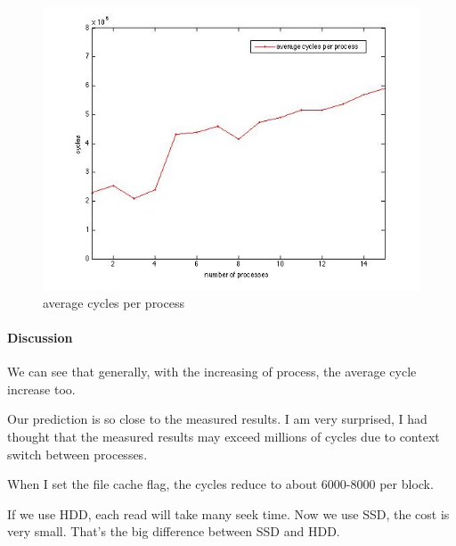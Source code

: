 \begin{figure}[htbp] %
   \centering
   \includegraphics[width=4.5in]{./pics/44.jpg} 
   \caption{average cycles per process}
   \label{fig:average cycles per process}
\end{figure}

\paragraph{Discussion}
We can see that generally, with the increasing of process, the average cycle increase too. 

Our prediction is so close to the measured results. I am very surprised, I had thought that the measured results may exceed millions of cycles due to context switch between processes.

When I set the file cache flag, the cycles reduce to about 6000-8000 per block.

If we use HDD, each read will take many seek time. Now we use SSD, the cost is very small. That's the big difference between SSD and HDD.
